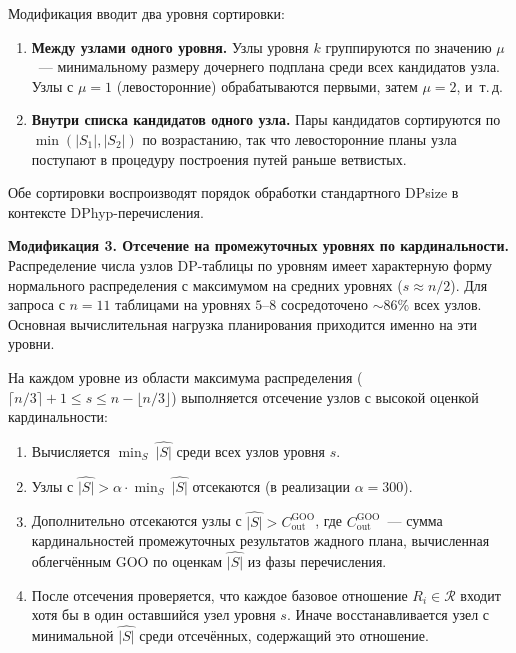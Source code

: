 Модификация вводит два уровня сортировки:
\begin{enumerate}
    \item \textbf{Между узлами одного уровня.}
    Узлы уровня $k$ группируются по значению $\mu$~---
    минимальному размеру дочернего подплана среди всех кандидатов узла.
    Узлы с $\mu = 1$ (левосторонние) обрабатываются первыми,
    затем $\mu = 2$, и~т.\,д.
    \item \textbf{Внутри списка кандидатов одного узла.}
    Пары кандидатов сортируются по $\min(|S_1|, |S_2|)$
    по возрастанию, так что левосторонние планы узла
    поступают в процедуру построения путей раньше ветвистых.
\end{enumerate}
Обе сортировки воспроизводят порядок обработки стандартного
DPsize в контексте DPhyp-перечисления.
\par

\textbf{Модификация 3. Отсечение на промежуточных уровнях по кардинальности.}
Распределение числа узлов DP-таблицы по уровням имеет характерную
форму нормального распределения с максимумом на средних уровнях
($s \approx n/2$). Для запроса с $n = 11$ таблицами на уровнях $5$--$8$
сосредоточено ${\sim}86\%$ всех узлов. Основная вычислительная нагрузка
планирования приходится именно на эти уровни.
\par

На каждом уровне из области максимума распределения ($\lceil n/3 \rceil + 1 \leqslant s \leqslant n - \lfloor n/3 \rfloor$)
выполняется отсечение узлов с высокой оценкой кардинальности:
\begin{enumerate}
    \item Вычисляется $\min_{S}\ \widehat{|S|}$ среди всех узлов уровня $s$.
    \item Узлы с $\widehat{|S|} > \alpha \cdot \min_{S}\ \widehat{|S|}$
    отсекаются (в реализации $\alpha = 300$).
    \item Дополнительно отсекаются узлы с $\widehat{|S|} > C_{\mathrm{out}}^{\mathrm{GOO}}$,
    где $C_{\mathrm{out}}^{\mathrm{GOO}}$~--- сумма кардинальностей промежуточных результатов
    жадного плана, вычисленная облегчённым GOO по оценкам $\widehat{|S|}$
    из фазы перечисления.
    \item После отсечения проверяется,
    что каждое базовое отношение $R_i \in \mathcal{R}$ входит хотя бы
    в один оставшийся узел уровня $s$. Иначе восстанавливается узел с минимальной
    $\widehat{|S|}$ среди отсечённых, содержащий это отношение.
\end{enumerate}

